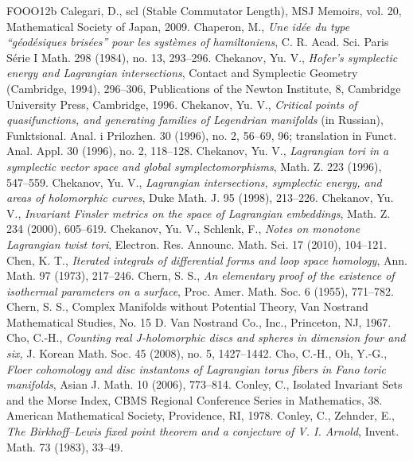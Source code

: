 \begin{thebibliography}{FOOO12b}
 Calegari, D., scl (Stable Commutator Length), MSJ Memoirs, vol. 20, Mathematical Society of Japan, 2009.
 Chaperon, M., \textit{Une idée du type \textquotedblleft{}géodésiques brisées\textquotedblright{} pour les systèmes of hamiltoniens}, C. R. Acad. Sci. Paris Série I Math. 298 (1984), no. 13, 293--296.
 Chekanov, Yu. V., \textit{Hofer\textquoteright{}s symplectic energy and Lagrangian intersections}, Contact and Symplectic Geometry (Cambridge, 1994), 296--306, Publications of the Newton Institute, 8, Cambridge University Press, Cambridge, 1996.
 Chekanov, Yu. V., \textit{Critical points of quasifunctions, and generating families of Legendrian manifolds} (in Russian), Funktsional. Anal. i Prilozhen. 30 (1996), no. 2, 56--69, 96; translation in Funct. Anal. Appl. 30 (1996), no. 2, 118--128.
 Chekanov, Yu. V., \textit{Lagrangian tori in a symplectic vector space and global symplectomorphisms}, Math. Z. 223 (1996), 547--559.
 Chekanov, Yu. V., \textit{Lagrangian intersections, symplectic energy, and areas of holomorphic curves}, Duke Math. J. 95 (1998), 213--226.
 Chekanov, Yu. V., \textit{Invariant Finsler metrics on the space of Lagrangian embeddings}, Math. Z. 234 (2000), 605--619.
 Chekanov, Yu. V., Schlenk, F., \textit{Notes on monotone Lagrangian twist tori}, Electron. Res. Announc. Math. Sci. 17 (2010), 104--121.
 Chen, K. T., \textit{Iterated integrals of differential forms and loop space homology}, Ann. Math. 97 (1973), 217--246.
 Chern, S. S., \textit{An elementary proof of the existence of isothermal parameters on a surface}, Proc. Amer. Math. Soc. 6 (1955), 771--782.
 Chern, S. S., Complex Manifolds without Potential Theory, Van Nostrand Mathematical Studies, No. 15 D. Van Nostrand Co., Inc., Princeton, NJ, 1967.
 Cho, C.-H., \textit{Counting real J-holomorphic discs and spheres in dimension four and six,} J. Korean Math. Soc. 45 (2008), no. 5, 1427--1442.
 Cho, C.-H., Oh, Y.-G., \textit{Floer cohomology and disc instantons of Lagrangian torus fibers in Fano toric manifolds}, Asian J. Math. 10 (2006), 773--814.
 Conley, C., Isolated Invariant Sets and the Morse Index, CBMS Regional Conference Series in Mathematics, 38. American Mathematical Society, Providence, RI, 1978.
 Conley, C., Zehnder, E., \textit{The Birkhoff--Lewis fixed point theorem and a conjecture of V. I. Arnold}, Invent. Math. 73 (1983), 33--49.

\end{thebibliography}

